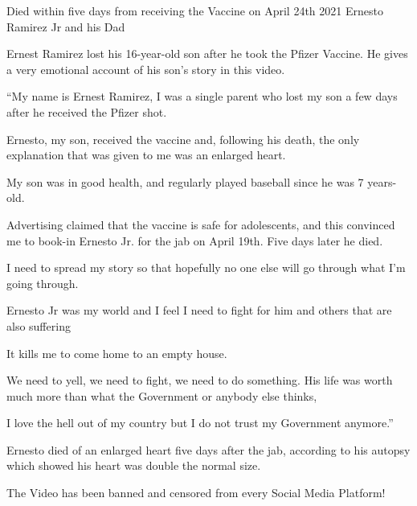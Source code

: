 Died within five days from receiving the Vaccine on April 24th 2021 Ernesto
Ramirez Jr and his Dad

Ernest Ramirez lost his 16-year-old son after he took the Pfizer Vaccine. He
gives a very emotional account of his son’s story in this video.

“My name is Ernest Ramirez, I was a single parent who lost my son a few days
after he received the Pfizer shot.

Ernesto, my son, received the vaccine and, following his death, the only
explanation that was given to me was an enlarged heart.

My son was in good health, and regularly played baseball since he was 7
years-old.

Advertising claimed that the vaccine is safe for adolescents, and this convinced
me to book-in Ernesto Jr. for the jab on April 19th. Five days later he died.

I need to spread my story so that hopefully no one else will go through what I’m
going through.

Ernesto Jr was my world and I feel I need to fight for him and others that are
also suffering

It kills me to come home to an empty house.

We need to yell, we need to fight, we need to do something. His life was worth
much more than what the Government or anybody else thinks,

I love the hell out of my country but I do not trust my Government anymore.”

Ernesto died of an enlarged heart five days after the jab, according to his
autopsy which showed his heart was double the normal size.

The Video has been banned and censored from every Social Media Platform!
